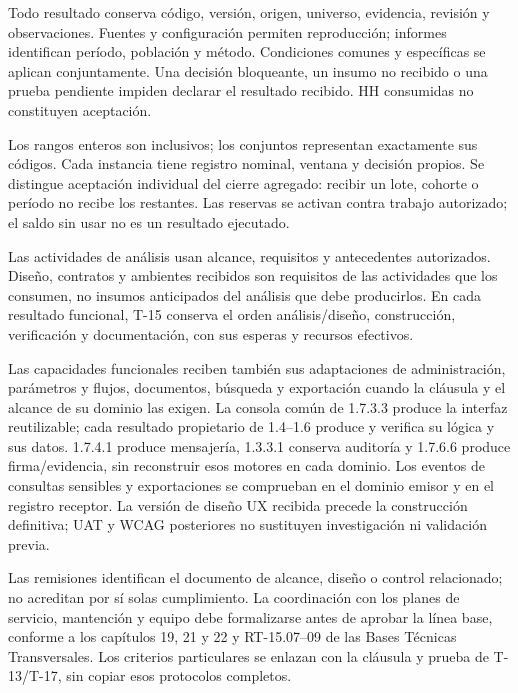 Todo resultado conserva código, versión, origen, universo, evidencia, revisión y observaciones. Fuentes y configuración permiten reproducción; informes identifican período, población y método. Condiciones comunes y específicas se aplican conjuntamente. Una decisión bloqueante, un insumo no recibido o una prueba pendiente impiden declarar el resultado recibido. HH consumidas no constituyen aceptación.

Los rangos enteros son inclusivos; los conjuntos representan exactamente sus códigos. Cada instancia tiene registro nominal, ventana y decisión propios. Se distingue aceptación individual del cierre agregado: recibir un lote, cohorte o período no recibe los restantes. Las reservas se activan contra trabajo autorizado; el saldo sin usar no es un resultado ejecutado.

Las actividades de análisis usan alcance, requisitos y antecedentes autorizados. Diseño, contratos y ambientes recibidos son requisitos de las actividades que los consumen, no insumos anticipados del análisis que debe producirlos. En cada resultado funcional, T-15 conserva el orden análisis/diseño, construcción, verificación y documentación, con sus esperas y recursos efectivos.

Las capacidades funcionales reciben también sus adaptaciones de administración, parámetros y flujos, documentos, búsqueda y exportación cuando la cláusula y el alcance de su dominio las exigen. La consola común de 1.7.3.3 produce la interfaz reutilizable; cada resultado propietario de 1.4--1.6 produce y verifica su lógica y sus datos. 1.7.4.1 produce mensajería, 1.3.3.1 conserva auditoría y 1.7.6.6 produce firma/evidencia, sin reconstruir esos motores en cada dominio. Los eventos de consultas sensibles y exportaciones se comprueban en el dominio emisor y en el registro receptor. La versión de diseño UX recibida precede la construcción definitiva; UAT y WCAG posteriores no sustituyen investigación ni validación previa.

Las remisiones identifican el documento de alcance, diseño o control relacionado; no acreditan por sí solas cumplimiento. La coordinación con los planes de servicio, mantención y equipo debe formalizarse antes de aprobar la línea base, conforme a los capítulos 19, 21 y 22 y RT-15.07--09 de las Bases Técnicas Transversales. Los criterios particulares se enlazan con la cláusula y prueba de T-13/T-17, sin copiar esos protocolos completos.
